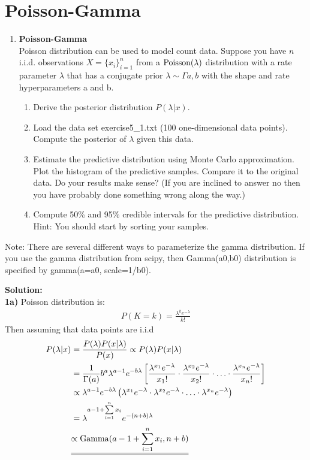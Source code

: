 \documentclass[12pt]{article}
\begin{document}
\section{Poisson-Gamma}
    \begin{tcolorbox}
        \begin{enumerate}
            \item \textbf{Poisson-Gamma}\\
            Poisson distribution can be used to model count data. Suppose you have $n$ i.i.d. observations $X = {\{x_i\}}_{i=1}^n$ from a $\operatorname{Poisson({\lambda})}$ distribution with a rate parameter $\lambda$ that has a conjugate prior $\lambda \sim \Gamma{a,b}$ with the shape and rate hyperparameters a and b.
            \begin{enumerate}
                \item Derive the posterior distribution $P(\lambda|x)$.
                \item Load the data set exercise5\_1.txt (100 one-dimensional data points). Compute the posterior of $\lambda$ given this data.
                \item Estimate the predictive distribution using Monte Carlo approximation. Plot the histogram of the predictive samples. Compare it to the original data. Do your results make sense? (If you are inclined to answer no then you have probably done something wrong along the way.)
                \item Compute 50\% and 95\% credible intervals for the predictive distribution. Hint: You should start by sorting your samples.
            \end{enumerate}
        \end{enumerate}
        Note: There are several different ways to parameterize the gamma distribution.
        If you use the gamma distribution from scipy, then Gamma(a0,b0) distribution
        is specified by gamma(a=a0, scale=1/b0).
    \end{tcolorbox}

    \def\Ppdf#1{\frac{\lambda^{#1} e^{-\lambda}}{{#1}!}}
    \def\Ppdfu#1{\lambda^{#1} e^{-\lambda}}
    \def\ld{\lambda}

    \textbf{Solution:}\\
    \textbf{1a)} Poisson distribution is:
    \begin{align}
        P(K=k) = \frac{\ld^k e^{-\ld}}{k!}
    \end{align}
    Then assuming that data points are i.i.d
    \begin{align}
        P(\ld | x) &= \frac{P(\ld) P(x|\ld)}{P(x)} \propto P(\ld) P(x | \ld) \\
        &= \frac{1}{\Gamma(a)}b^a \ld^{a-1} e^{-b\ld} \left[ \Ppdf{x_1} \cdot \Ppdf{x_2} \cdot \ldots \cdot \Ppdf{x_n} \right] \\
        &\propto \ld^{a-1} e^{-b\ld} \left( \Ppdfu{x_1} \cdot \Ppdfu{x_2} \cdot \ldots \cdot \Ppdfu{x_n} \right) \\
        &= \ld^{a-1 + \sumlim{1}{n} x_i} e^{-(n+b)\ld} \\
        &\dunderline{\propto \operatorname{Gamma}(a - 1 + \sumlim{1}{n} x_i, n+b)}
    \end{align}
\end{document}
